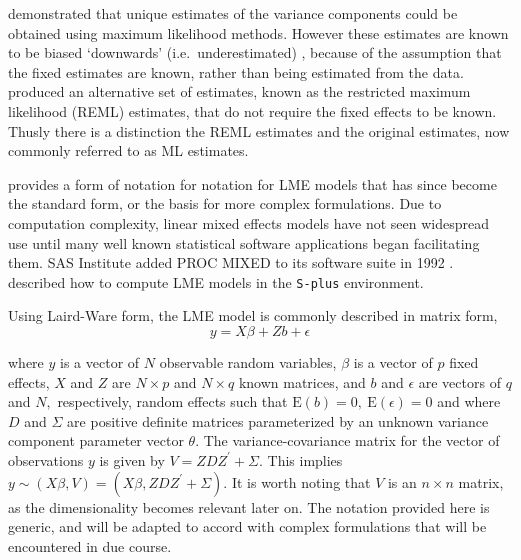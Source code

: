 \documentclass[12pt, a4paper]{report}
\theoremstyle{plain}
\theoremstyle{definition}
\theoremstyle{remark}
\begin{document}
	\citet{HartleyRao} demonstrated that unique estimates of the variance components could be obtained using maximum likelihood methods. However these estimates are known to be biased `downwards' (i.e.\ underestimated) , because of the assumption that the fixed estimates are known, rather than being estimated from the data. \citet{PattersonThompson} produced an alternative set of estimates, known as the restricted maximum likelihood (REML) estimates, that do not require the fixed effects to be known. Thusly there is a distinction the REML estimates and the original estimates, now commonly referred to as ML estimates.
	
	\citet{LW82} provides a form of notation for notation for LME models that has since become the standard form, or the basis for more complex formulations. Due to computation complexity, linear mixed effects models have not seen widespread use until many well known statistical software applications began facilitating them. SAS Institute added PROC MIXED to its software suite in 1992 \citep{singer}. \citet{PB} described how to compute LME models in the \texttt{S-plus} environment.
	
	Using Laird-Ware form, the LME model is commonly described in matrix form,
	\begin{equation}
	y = X\beta + Zb + \epsilon
	\label{LW}
	\end{equation}
	
	\noindent where $y$ is a vector of $N$ observable random variables, $\beta$ is a vector of $p$ fixed effects, $X$ and $Z$ are $N \times p$ and $N \times q$ known matrices, and $b$ and $\epsilon$  are vectors of $q$ and $N,$ respectively, random effects such that $\mathrm{E}(b)=0, \ \mathrm{E}(\epsilon)=0$
	and
	where $D$ and $\Sigma$ are positive definite matrices parameterized by an unknown variance component parameter vector $ \theta.$ The variance-covariance matrix for the vector of observations $y$ is given by $V = ZDZ^{\prime}+ \Sigma.$ This implies $y \sim(X\beta, V) = (X\beta,ZDZ^{\prime}+ \Sigma)$. It is worth noting that $V$ is an $n \times n$ matrix, as the dimensionality becomes relevant later on. The notation provided here is generic, and will be adapted to accord with complex formulations that will be encountered in due course.
	
	
\end{document}
